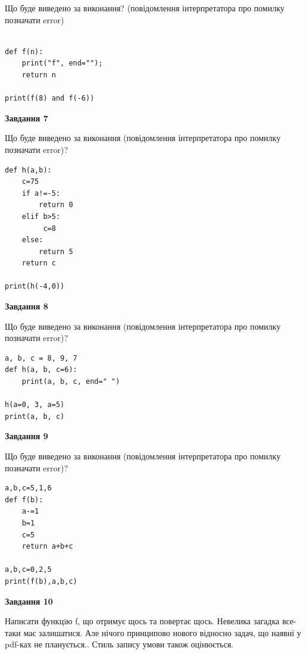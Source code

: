 \documentclass[12pt, ukrainian]{article}
\begin{document}
{\begin {large}
Що буде виведено за виконання? (повідомлення інтерпретатора про помилку позначати error)\par
\begin{verbatim}

def f(n):
    print("f", end="");
    return n

print(f(8) and f(-6))
\end{verbatim}

{\begin {center}\textbf{Завдання 7}\end {center}}

Що буде виведено за виконання (повідомлення інтерпретатора про помилку позначати error)?\par
\begin{verbatim}
def h(a,b):
    c=75
    if a!=-5:
        return 0
    elif b>5:
         c=8
    else: 
        return 5
    return c

print(h(-4,0))
\end{verbatim}

{\begin {center}\textbf{Завдання 8}\end {center}}

Що буде виведено за виконання (повідомлення інтерпретатора про помилку позначати error)?\par
\begin{verbatim}
a, b, c = 8, 9, 7
def h(a, b, c=6):
    print(a, b, c, end=" ")

h(a=0, 3, a=5)
print(a, b, c)
\end{verbatim}

{\begin {center}\textbf{Завдання 9}\end {center}}

Що буде виведено за виконання (повідомлення інтерпретатора про помилку позначати error)?\par
\begin{verbatim}
a,b,c=5,1,6
def f(b):
    a-=1
    b=1
    c=5
    return a+b+c

a,b,c=0,2,5
print(f(b),a,b,c)
\end{verbatim}

{\begin {center}\textbf{Завдання 10}\end {center}}


Написати функцiю f, що отримує щось та повертає щось. Невелика загадка все-таки має залишатися. Але нічого принципово нового відносно задач, що наявні у pdf-ках не планується.. Стиль запису умови також оцінюється.\par
\end {large}}
\newpage
\end{document}

